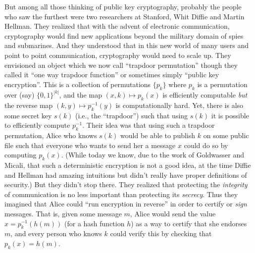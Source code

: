But among all those thinking of public key cryptography, probably the
people who saw the furthest were two researchers at Stanford, Whit
Diffie and Martin Hellman. They realized that with the advent of
electronic communication, cryptography would find new applications
beyond the military domain of spies and submarines. And they understood
that in this new world of many users and point to point communication,
cryptography would need to scale up. They envisioned an object which we
now call ``trapdoor permutation'' though they called it ``one way
trapdoor function'' or sometimes simply ``public key encryption''. This
is a collection of permutations \(\{ p_k \}\) where \(p_k\) is a
permutation over (say) \(\{0,1\}^{|k|}\), and the map
\((x,k)\mapsto p_k(x)\) is efficiently computable \emph{but} the reverse
map \((k,y) \mapsto p_k^{-1}(y)\) is computationally hard. Yet, there is
also some secret key \(s(k)\) (i.e., the ``trapdoor'') such that using
\(s(k)\) it is possible to efficiently compute \(p^{-1}_k\). Their idea
was that using such a trapdoor permutation, Alice who knows \(s(k)\)
would be able to publish \(k\) on some public file such that everyone
who wants to send her a message \(x\) could do so by computing
\(p_k(x)\). (While today we know, due to the work of Goldwasser and
Micali, that such a deterministic encryption is not a good idea, at the
time Diffie and Hellman had amazing intuitions but didn't really have
proper definitions of security.) But they didn't stop there. They
realized that protecting the \emph{integrity} of communication is no
less important than protecting its \emph{secrecy}. Thus they imagined
that Alice could ``run encryption in reverse'' in order to certify or
\emph{sign} messages. That is, given some message \(m\), Alice would
send the value \(x=p_k^{-1}(h(m))\) (for a hash function \(h\)) as a way
to certify that she endorses \(m\), and every person who knows \(k\)
could verify this by checking that \(p_k(x)=h(m)\).

